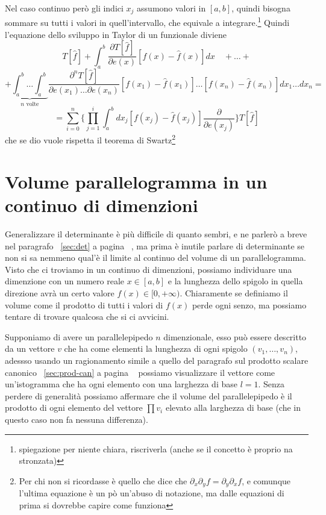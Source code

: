 \documentclass[11pt,a4paper]{report}
\theoremstyle{definition}
\theoremstyle{plain}
\theoremstyle{plain}
\begin{document}
			Nel caso continuo però gli indici $x_j$ assumono valori in $[a,b]$, quindi bisogna sommare su tutti i valori in quell'intervallo, che equivale a integrare.\footnote{spiegazione per niente chiara, riscriverla (anche se il concetto è proprio na stronzata)}\newline
			Quindi l'equazione dello sviluppo in Taylor di un funzionale diviene
			\begin{equation}
				T[\hat f]+\int_a^b \frac{\partial T[\hat f]}{\partial e(x)}[f(x)-\hat f(x)]dx\quad+\dots+
			\end{equation}
			\[
				+\underbrace{\int_a^b\dots\int_a^b}_{n\textrm{ volte}}
				\frac{\partial^n T[\hat f]}{\partial e(x_1)\dots\partial e(x_n)}[f(x_1)-\hat f(x_1)]\dots[f(x_n)-\hat f(x_n)]dx_1\dots dx_n=
			\]
			\begin{equation}
				=\sum_{i=0}^n \Bigg\{\prod_{j=1}^i \int_a^b dx_j[f(x_j)-\hat f(x_j)]\frac{\partial}{\partial e(x_j)}\Bigg\}T[\hat f]
			\end{equation}
			che se dio vuole rispetta il teorema di Swartz\footnote{Per chi non si ricordasse è quello che dice che $\partial_x\partial_y f=\partial_y\partial_x f$, e comunque l'ultima equazione è un pò un'abuso di notazione, ma dalle equazioni di prima si dovrebbe capire come funziona}




		\section{Volume parallelogramma in un continuo di dimenzioni}
			Generalizzare il determinante è più difficile di quanto sembri, e ne parlerò a breve nel paragrafo ~\ref{sec:det} a pagina ~\pageref{sec:det}, ma prima è inutile parlare di determinante se non si sa nemmeno qual'è il limite al continuo del volume di un parallelogramma.\newline
			Visto che ci troviamo in un continuo di dimenzioni, possiamo individuare una dimenzione con un numero reale $x\in[a,b]$ e la lunghezza dello spigolo in quella direzione avrà un certo valore $f(x)\in[0,+\infty)$.\newline
			Chiaramente se definiamo il volume come il prodotto di tutti i valori di $f(x)$ perde ogni senzo, ma possiamo tentare di trovare qualcosa che si ci avvicini.\newline

			Supponiamo di avere un parallelepipedo $n$ dimenzionale, esso può essere descritto da un vettore $v$ che ha come elementi la lunghezza di ogni spigolo $(v_1,\dots,v_n)$, adessso usando un ragionamento simile a quello del paragrafo sul prodotto scalare canonico ~\ref{sec:prod-can} a pagina ~\pageref{sec:prod-can} possiamo visualizzare il vettore come un'istogramma che ha ogni elemento con una larghezza di base $l=1$.\newline
			Senza perdere di generalità possiamo affermare che il volume del parallelepipedo è il prodotto di ogni elemento del vettore $\prod v_i$ elevato alla larghezza di base (che in questo caso non fa nessuna differenza).\newline
\end{document}
